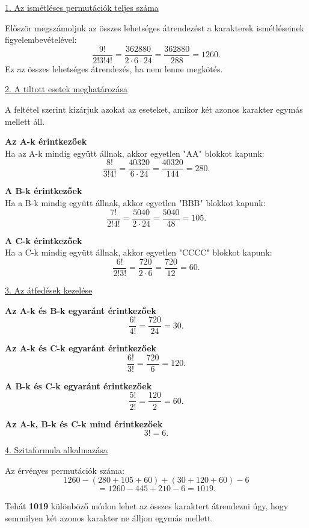 \begin{solution}

\underline{1. Az ismétléses permutációk teljes száma}

Először megszámoljuk az összes lehetséges átrendezést a karakterek
ismétléseinek figyelembevételével: 
\[
\frac{9!}{2!3!4!}=\frac{362880}{2\cdot6\cdot24}=\frac{362880}{288}=1260.
\]
Ez az összes lehetséges átrendezés, ha nem lenne megkötés.

\underline{2. A tiltott esetek meghatározása}

A feltétel szerint kizárjuk azokat az eseteket, amikor két azonos
karakter egymás mellett áll.

\textbf{Az A-k érintkezőek}\\

Ha az A-k mindig együtt állnak, akkor egyetlen "AA" blokkot kapunk:
\[
\frac{8!}{3!4!}=\frac{40320}{6\cdot24}=\frac{40320}{144}=280.
\]

\textbf{A B-k érintkezőek}\\

Ha a B-k mindig együtt állnak, akkor egyetlen "BBB" blokkot kapunk:
\[
\frac{7!}{2!4!}=\frac{5040}{2\cdot24}=\frac{5040}{48}=105.
\]

\textbf{A C-k érintkezőek}\\

Ha a C-k mindig együtt állnak, akkor egyetlen "CCCC" blokkot kapunk:
\[
\frac{6!}{2!3!}=\frac{720}{2\cdot6}=\frac{720}{12}=60.
\]

\underline{3. Az átfedések kezelése}

\textbf{Az A-k és B-k egyaránt érintkezőek}\\

\[
\frac{6!}{4!}=\frac{720}{24}=30.
\]

\textbf{Az A-k és C-k egyaránt érintkezőek}\\

\[
\frac{6!}{3!}=\frac{720}{6}=120.
\]

\textbf{A B-k és C-k egyaránt érintkezőek}\\

\[
\frac{5!}{2!}=\frac{120}{2}=60.
\]

\textbf{Az A-k, B-k és C-k mind érintkezőek}\\

\[
3!=6.
\]

\underline{4. Szitaformula alkalmazása}

Az érvényes permutációk száma: 
\[
1260-(280+105+60)+(30+120+60)-6
\]
\[
=1260-445+210-6=1019.
\]

Tehát \textbf{1019} különböző módon lehet az összes karaktert átrendezni
úgy, hogy semmilyen két azonos karakter ne álljon egymás mellett.
\end{solution}
